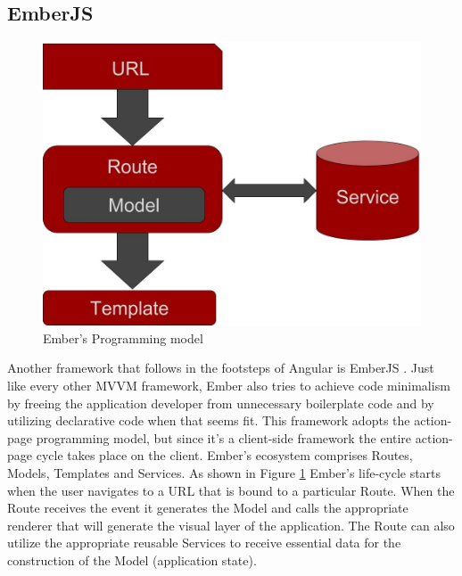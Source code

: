 {\subsection{EmberJS}



\begin{figure}[t]
\centering
\includegraphics[width=\columnwidth]{figures/ember-programming-model}
\caption{Ember's Programming model}
\label{figure:ember-programming-model}
\end{figure}




Another framework that follows in the footsteps of Angular is EmberJS \cite{ember}. Just like every other MVVM framework, Ember also tries to achieve code minimalism by freeing the application developer from unnecessary boilerplate code and by utilizing declarative code when that seems fit. This framework adopts the action-page programming model, but since it's a client-side framework the entire action-page cycle takes place on the client. Ember's ecosystem comprises Routes, Models, Templates and Services. As shown in Figure \ref{figure:ember-programming-model} Ember's life-cycle starts when the user navigates to a URL that is bound to a particular Route. When the Route receives the event it generates the Model and calls the appropriate renderer that will generate the visual layer of the application. The Route can also utilize the appropriate reusable Services to receive essential data for the construction of the Model (application state).

}
